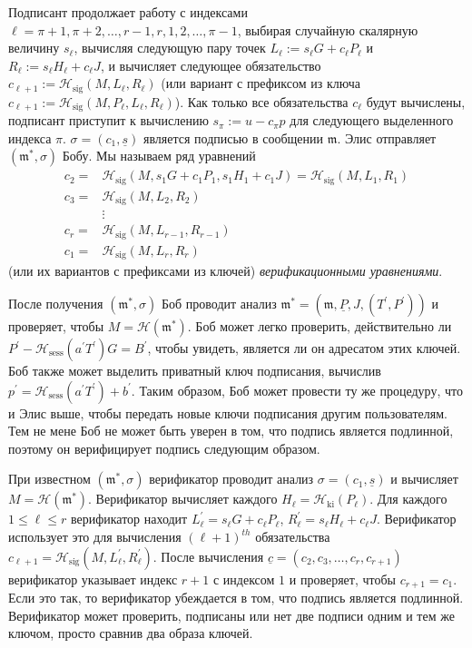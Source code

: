 \documentclass{mrl}
\theoremstyle{definition}
\numberwithin{theorem}{subsection}
\newcommand{\m}{\mathfrak{m}}
\begin{document}
Подписант продолжает работу с индексами $\ell=\pi+1, \pi+2, \ldots, r-1, r, 1, 2, \ldots, \pi-1$, выбирая случайную скалярную величину $s_\ell$, вычисляя следующую пару точек $L_\ell := s_\ell G + c_\ell P_\ell$ и $R_\ell := s_\ell H_\ell + c_\ell J$, и вычисляет следующее обязательство $c_{\ell+1}:=\mathcal{H}_{\text{sig}}(M,L_\ell, R_\ell)$ (или вариант с префиксом из ключа $c_{\ell+1}:=\mathcal{H}_{\text{sig}}(M,P_\ell, L_\ell, R_\ell)$). Как только все обязательства $c_\ell$ будут вычислены, подписант приступит к вычислению $s_{\pi} := u - c_{\pi}p$ для следующего выделенного индекса $\pi$. $\sigma=(c_1, \underline{s})$ является подписью в сообщении $\m$. Элис отправляет $(\m^*, \sigma)$ Бобу. Мы называем ряд уравнений \begin{align*}
c_2 =& \mathcal{H}_{\text{sig}}(M, s_1 G + c_1 P_1, s_1 H_1 + c_1 J) = \mathcal{H}_{\text{sig}}(M, L_1, R_1)\\
c_3 =& \mathcal{H}_{\text{sig}}(M, L_2, R_2)\\
& \vdots \\
c_r =& \mathcal{H}_{\text{sig}}(M, L_{r-1}, R_{r-1})\\
c_1 =& \mathcal{H}_{\text{sig}}(M, L_r, R_r)
\end{align*} (или их вариантов с префиксами из ключей) \textit{верификационными уравнениями}.

После получения $(\m^*, \sigma)$ Боб проводит анализ $\m^* = (\m, \underline{P}, J, (T^\prime, P^\prime))$ и проверяет, чтобы $M = \mathcal{H}(\m^*)$. Боб может легко проверить, действительно ли $P^{\prime} - \mathcal{H}_{\text{sess}}(a^\prime T^\prime)G = B^\prime$, чтобы увидеть, является ли он адресатом этих ключей. Боб также может выделить приватный ключ подписания, вычислив $p^\prime = \mathcal{H}_{\text{sess}}(a^\prime T^\prime) + b^\prime$. Таким образом, Боб может провести ту же процедуру, что и Элис выше, чтобы передать новые ключи подписания другим пользователям. Тем не мене Боб не может быть уверен в том, что подпись является подлинной, поэтому он верифицирует подпись следующим образом.

При известном $(\m^*, \sigma)$ верификатор проводит анализ $\sigma = (c_1, \underline{s})$ и вычисляет $M = \mathcal{H}(\m^*)$. Верификатор вычисляет каждого $H_\ell = \mathcal{H}_{\text{ki}}(P_\ell)$. Для каждого $1 \leq \ell \leq r$ верификатор находит $L_{\ell}^{\prime} = s_\ell G + c_\ell P_\ell$, $R_{\ell}^{\prime} = s_\ell H_\ell + c_\ell J$. Верификатор использует это для вычисления $(\ell+1)^{th}$ обязательства $c_{\ell+1} = \mathcal{H}_{\text{sig}}(M, L_{\ell}^{\prime}, R_{\ell}^{\prime})$. После вычисления $\underline{c} = (c_2, c_3, \ldots, c_r, c_{r+1})$ верификатор указывает индекс $r+1$ с индексом $1$ и проверяет, чтобы $c_{r+1} = c_1$. Если это так, то верификатор убеждается в том, что подпись является подлинной. Верификатор может проверить, подписаны или нет две подписи одним и тем же ключом, просто сравнив два образа ключей.
\end{document}
